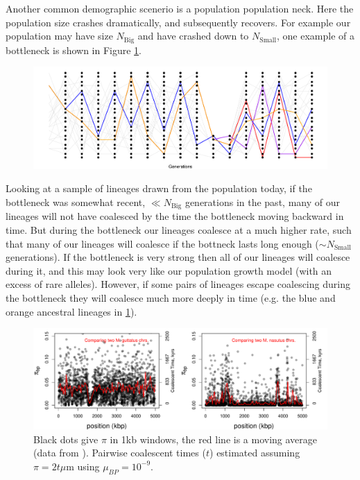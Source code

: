 Another common demographic scenerio is a population population
neck. Here the population size crashes dramatically, and subsequently
recovers. For example our population may have size $N_{\textrm{Big}}$
and have crashed down to $N_{\textrm{Small}}$, one example of a
bottleneck is shown in Figure \ref{fig:Genealogy_crash}. 
\begin{figure}
\begin{center}
  \includegraphics[width = \textwidth]{figures/Genetic_drift/Demography/Crash_genealogy.pdf}
\end{center}
\caption{} \label{fig:Genealogy_crash}
\end{figure}
Looking at a sample of lineages drawn from the population today, if
the bottleneck was somewhat recent, $\ll N_{\textrm{Big}}$ generations
in the past, many of our lineages will not have coalesced by the time
the bottleneck moving backward in time. But during the bottleneck our
lineages coalesce at a much higher rate, such that many of our
lineages will coalesce if the bottneck lasts long enough
($\sim N_{\textrm{Small}}$ generations). If the bottleneck is very
strong then all of our lineages will coalesce during it, and this may
look very like our population growth model (with an excess of rare
alleles). However, if some pairs of lineages escape coalescing during
the bottleneck they will coalesce much more deeply in time (e.g. the
blue and orange ancestral lineages in
\ref{fig:Genealogy_crash}). 
\begin{figure}
\begin{center}
  \includegraphics[width = \textwidth]{figures/Genetic_drift/Demography/Mimulus_coalescent_times.pdf}
\end{center}
\caption{Black dots give $\pi$ in 1kb windows, the red line is a
  moving average (data from  \citeauthor{brandvain:14}). Pairwise coalescent times ($t$) estimated assuming $\pi = 2 t
  \mu$m using $\mu_{BP}=10^{-9}$.} \label{fig:Mimulus_bottleneck}
\end{figure}
